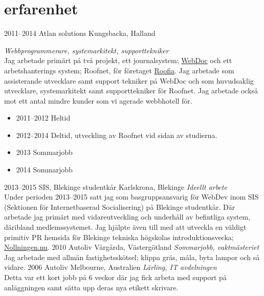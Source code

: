 \documentclass[]{friggeri-cv} %
\begin{document}

\section{erfarenhet}

\begin{entrylist}
\entry
{2011--2014}
{Atlan solutions}
{Kungsbacka, Halland}
{\emph{Webbprogrammerare, systemarkitekt, supporttekniker} \\
Jag arbetade primärt på två projekt, ett journalsystem; \href{http://atlan.se/}{WebDoc} och ett arbetshanterings system; Roofnet, för företaget \href{http://www.roofia.se/}{Roofia}. Jag arbetade som assisterande utvecklare samt support tekniker på WebDoc och som huvudsaklig utvecklare, systemarkitekt samt supporttekniker för Roofnet. Jag arbetade också mot ett antal mindre kunder som vi agerade webbhotell för. \\
\begin{itemize}
	\item 2011--2012 Heltid
	\item 2012--2014 Deltid, utveckling av Roofnet vid sidan av studierna.
	\item 2013 Sommarjobb
	\item 2014 Sommarjobb
\end{itemize}
}
\entry
{2013--2015}
{SIS, Blekinge studentkår}
{Karlskrona, Blekinge}
{\emph{Ideellt arbete} \\
Under perioden 2013--2015 satt jag som basgruppsansvarig för WebDev inom SIS (Sektionen för Internetbaserad Socialisering) på Blekinge studentkår. Där arbetade jag primärt med vidareutveckling och underhåll av befintliga system, däribland medlemssystemet. Jag hjälpte även till med att utveckla en väldigt primitiv PR hemsida för Blekinge tekniska högskolas introduktionsvecka; \href{http://www.nollningen.nu}{Nollningen.nu}. }
\entry
{2010}
{Autoliv}
{Vårgårda, Västergötland}
{\emph{Sommarjobb, vaktmästeriet} \\
	Jag arbetade med allmän fastighetsskötsel; klippa gräs, måla, byta lampor och så vidare.}
\entry
{2006}
{Autoliv}
{Melbourne, Australien}
{\emph{Lärling, IT avdelningen} \\
Detta var ett kort jobb på 6 veckor där jag fick arbeta med support på anläggningen samt sätta upp deras nya etikett skrivare.}
\end{entrylist}
\end{document}
